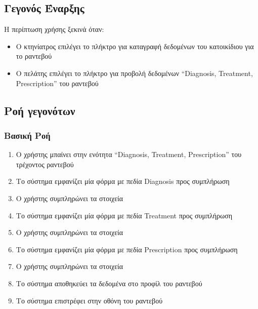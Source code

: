 \documentclass[12pt,a4paper,twoside]{book}
\begin{document}
\subsection{Γεγονός Έναρξης}
Η περίπτωση χρήσης ξεκινά όταν:
\begin{itemize}
  \item Ο κτηνίατρος επιλέγει το πλήκτρο για καταγραφή δεδομένων του κατοικίδιου για το ραντεβού  %
  \item Ο πελάτης επιλέγει το πλήκτρο για προβολή δεδομένων “Diagnosis, Treatment, Prescription” του ραντεβού %
\end{itemize}

\subsection{Ροή γεγονότων}

\subsubsection{Βασική Ροή}
\begin{enumerate}
  \item Ο χρήστης μπαίνει στην ενότητα “Diagnosis, Treatment, Prescription” του τρέχοντος ραντεβού  %
  \item Το σύστημα εμφανίζει μία φόρμα με πεδία Diagnosis προς συμπλήρωση %
  \item Ο χρήστης συμπληρώνει τα στοιχεία  %
  \item Το σύστημα εμφανίζει μία φόρμα με πεδία Treatment προς συμπλήρωση  %
  \item Ο χρήστης συμπληρώνει τα στοιχεία   %
  \item Το σύστημα εμφανίζει μία φόρμα με πεδία Prescription προς συμπλήρωση  %
  \item Ο χρήστης συμπληρώνει τα στοιχεία  %
  \item Το σύστημα αποθηκεύει τα δεδομένα στο προφίλ του ραντεβού  %
  \item Το σύστημα επιστρέφει στην οθόνη του ραντεβού
\end{enumerate}
\end{document}
